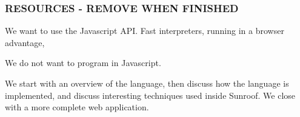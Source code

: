 \begin{comment}

An essential part of most modern web applications is Javascript.
It opens various possibilities to create browser based applications.
Examples for this development are Googlemail or Facebook.
These applications rely on Javascript heavily. What makes this 
development possible are the fast interpreters available in all
major browsers. Developing applications inside the browser has
the advantage of being independent from the underlying hard- and
software platform. The problem is shifted from the actual machine
to the browser. Also modern web technologies like HTML5 and CSS
give easy to use tools for developing user interfaces for the
mentioned application. They are standardized and improved over years
up to now. 

Yet, writing actual code in Javascript can be tedious and error prone 
due to its not-statically typed nature. Also the object-oriented
paradigm and the callback mechanism used instead of proper multi-threading 
can be a stumbling block for veteran Haskell programmers. Especially when
facing the lack of type safety.

To make the power of Javascript available to Haskell programmers 
we developed Sunroof. It enables Haskell programmers to write
Javascript using Haskell through a deep embedding. This 
approach has several advantages:

\begin{description}
\item[Type Safety:] Sunroof provides custom types for all major Javascript
types. Thus it gives type safety similar to what we are used to from 
normal Haskell programs when writing Javascript.
\item[Paradigms \& Patterns:] As a Haskell EDSL Sunroof follows functional programming 
paradigms and principals. It is possible to reuse common combinators and 
patterns in Sunroof.
\item[Similarity:] At the same time Sunroof offers a API for Javascript 
that allows to translate Javascript into Sunroof code easily.
\item[Optimization:] Due to Sunroofs deep embedded nature it is able
to apply optimizations like expression sharing when compiling to Javascript.
\end{description}

\NOTE{This might be a bit to enthusiastic.}

\end{comment}

\subsubsection{RESOURCES - REMOVE WHEN FINISHED}

We want to use the Javascript API. Fast interpreters,
running in a browser advantage, 

We do not want to program in Javascript.

We start with an overview of the language, then discuss
how the language is implemented, and discuss interesting
techniques used inside Sunroof. We close with a more
complete web application.




